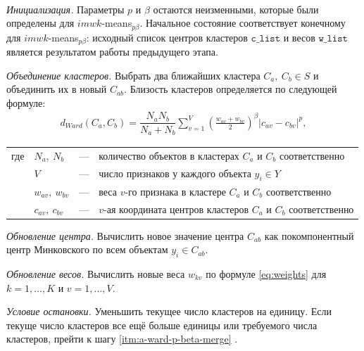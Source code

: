 \documentclass[12pt]{a&t}
\begin{document}
\begin{algorithm} \label{alg:a-ward-p-beta}
	\
	\begin{enumlist}[.] 
		\item \textit{Инициализация.} Параметры $ p $ и $ \beta $ остаются неизменными, которые были определены для \mbox{$ imwk$-means$_{p\beta} $}. Начальное состояние соответствует конечному для \mbox{$ imwk$-means$_{p\beta} $}: исходный список центров кластеров $ \mathtt{c\_list} $ и весов $ \mathtt{w\_list} $ является результатом работы предыдущего этапа.
		
		\item \label{itm:a-ward-p-beta-merge} \textit{Объединение кластеров.} Выбрать два ближайших кластера $ C_a,\:C_b \in S$ и объединить их в новый $ C_{ab} $. Близость кластеров определяется по следующей формуле: 
		\begin{gather} \label{eq:ward-p-beta-distance}
		d_{Ward}(C_a,C_b)=\dfrac{N_aN_b}{N_a+N_b}\sum_{v=1}^{V}\left ( \frac{w_{av}+w_{bv}}{2} \right )^\beta |c_{av}-c_{bv}|^p,
		\end{gather}
		
		\begin{tabular}{llll}
			где & $ N_a,\:N_b $ & {---} & количество объектов в кластерах $ C_a $ и $ C_b $ соответственно \\
			& $ V $ & {---} & число признаков у каждого объекта $ y_i \in Y $ \\
			& $w_{av},\:w_{bv} $ & {---} & веса $ v $-го признака в кластере $ C_a $ и $ C_b $ соответственно \\
			& $ c_{av},\:c_{bv} $ & {---} & $ v $-ая координата центров кластеров $ C_a $ и $ C_b $ соответственно 
		\end{tabular}
		
		\item \textit{Обновление центра.} Вычислить новое значение центра $ C_{ab} $ как покомпонентный центр Минковского по всем объектам $ y_i \in C_{ab} $.
		
		\item \textit{Обновление весов.} Вычислить новые веса $ w_{kv} $ по формуле \ref{eq:weights} для $ k=1,\ldots,K $ и $ v=1,\ldots,V $.
		
		\item \textit{Условие остановки.} Уменьшить текущее число кластеров на единицу. Если текуще число кластеров все ещё больше единицы или требуемого числа кластеров, прейти к шагу \ref{itm:a-ward-p-beta-merge} .
			
	\end{enumlist}
\end{algorithm}
\end{document}
